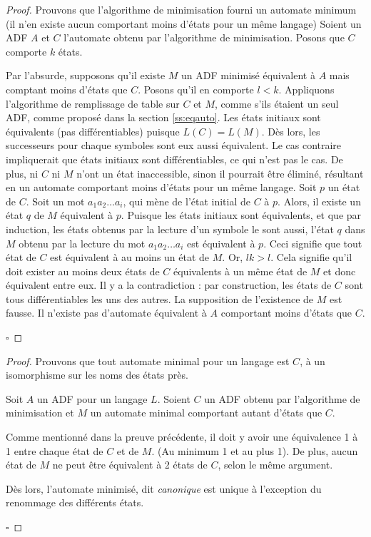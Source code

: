  
 	\begin{proof}
 		Prouvons que l'algorithme de minimisation fourni un automate minimum (il n'en existe aucun comportant moins d'états pour un même langage)
 		Soient un ADF $A$ et $C$ l'automate obtenu par l'algorithme de minimisation. Posons que $C$ comporte $k$ états.
 		
 		Par l'absurde, supposons qu'il existe $M$ un ADF minimisé équivalent à $A$ mais comptant moins d'états que $C$. Posons qu'il en comporte $l<k$.
 		Appliquons l'algorithme de remplissage de table sur $C$ et $M$, comme s'ils étaient un seul ADF, comme proposé dans la section \ref{ss:eqauto}. Les états initiaux sont équivalents (pas différentiables) puisque $L(C)=L(M)$. Dès lors, les successeurs pour chaque symboles sont eux aussi équivalent. Le cas contraire impliquerait que états initiaux sont différentiables, ce qui n'est pas le cas.
 		De plus, ni $C$ ni $M$ n'ont un état inaccessible, sinon il pourrait être éliminé, résultant en un automate comportant moins d'états pour un même langage.
 		Soit $p$ un état de $C$. Soit un mot $a_1a_2\dots a_i$, qui mène de l'état initial de $C$ à $p$. Alors, il existe un état $q$ de $M$ équivalent à $p$. Puisque les états initiaux sont équivalents, et que par induction, les états obtenus par la lecture d'un symbole le sont aussi, l'état $q$ dans $M$ obtenu par la lecture du mot $a_1a_2\dots a_i$ est équivalent à $p$. Ceci signifie que tout état de $C$ est équivalent à au moins un état de $M$.
 		Or, $lk>l$. Cela signifie qu'il doit exister au moins deux états de $C$ équivalents à un même état de $M$ et donc équivalent entre eux. Il y a la contradiction : par construction, les états de $C$ sont tous différentiables les uns des autres. La supposition de l'existence de $M$ est fausse. Il n'existe pas d'automate équivalent à $A$ comportant moins d'états que $C$. 
 		
 		\hfill$\square$		
 	\end{proof}
 
 	\begin{proof}
 		Prouvons que tout automate minimal pour un langage est $C$, à un isomorphisme sur les noms des états près.
 		
 		Soit $A$ un ADF pour un langage $L$. Soient $C$ un ADF obtenu par l'algorithme de minimisation et $M$ un automate minimal comportant autant d'états que $C$.
 		
 		Comme mentionné dans la preuve précédente, il doit y avoir une équivalence 1 à 1 entre chaque état de $C$ et de $M$. (Au minimum 1 et au plus 1). De plus, aucun état de $M$ ne peut être équivalent à 2 états de $C$, selon le même argument.
 		
 		Dès lors, l'automate minimisé, dit \emph{canonique} est unique à l'exception du renommage des différents états. 		
 		
 		\hfill$\square$ 
 	\end{proof}
 
